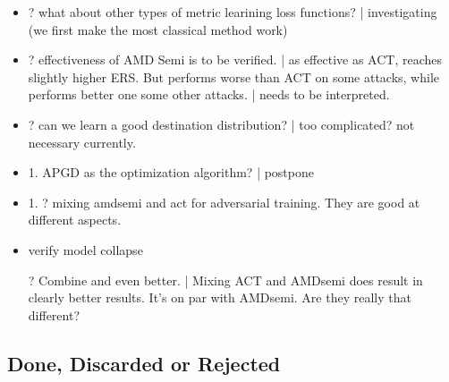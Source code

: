 \begin{itemize}
	\item ?  what about other types of metric learining loss functions? |
		investigating (we first make the most classical method work)

	\item ?  effectiveness of AMD Semi is to be verified. | as effective
		as ACT, reaches slightly higher ERS. But performs worse than ACT on
		some attacks, while performs better one some other attacks. | needs to
		be interpreted.

	\item ? can we learn a good destination distribution? | too
		complicated? not necessary currently.

	\item 1. APGD as the optimization algorithm? | postpone

	\item 1. ? mixing amdsemi and act for adversarial training. They are good
		at different aspects.

	\item verify model collapse

	\item [?] Combine and even better. | Mixing ACT and AMDsemi does result
		in clearly better results. It's on par with AMDsemi. Are they really
		that different?

\end{itemize}


\subsection{Done, Discarded or Rejected}

